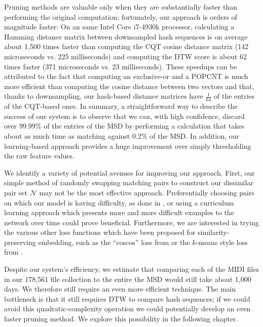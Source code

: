 Pruning methods are valuable only when they are substantially faster than performing the original computation; fortunately, our approach is orders of magnitude faster:
On an same Intel Core i7-4930k processor, calculating a Hamming distance matrix between downsampled hash sequences is on average about 1,500 times faster than computing the CQT cosine distance matrix (142 microseconds vs. 225 milliseconds) and computing the DTW score is about 62 times faster (371 microseconds vs. 23 milliseconds).
These speedups can be attributed to the fact that computing an exclusive-or and a POPCNT is much more efficient than computing the cosine distance between two vectors and that, thanks to downsampling, our hash-based distance matrices have $\frac{1}{64}$ of the entries of the CQT-based ones.
In summary, a straightforward way to describe the success of our system is to observe that we can, with high confidence, discard over 99.99\% of the entries of the MSD by performing a calculation that takes about as much time as matching against 0.2\% of the MSD.
In addition, our learning-based approach provides a huge improvement over simply thresholding the raw feature values.

We identify a variety of potential avenues for improving our approach.
First, our simple method of randomly swapping matching pairs to construct our dissimilar pair set $\mathcal{N}$ may not be the most effective approach.
Preferentially choosing pairs on which our model is having difficulty, as done in \cite{schroff2015facenet}, or using a curriculum learning approach which presents more and more difficult examples to the network over time \cite{bengio2009curriculum} could prove beneficial.
Furthermore, we are interested in trying the various other loss functions which have been proposed for similarity-preserving embedding, such as the ``coscos'' loss from \cite{kamper2016deep} or the $k$-means style loss from \cite{hershey2016deep}.

Despite our system's efficiency, we estimate that comparing each of the MIDI files in our 178,561 file collection to the entire the MSD would still take about 1,000 days.
We therefore still require an even more efficient technique.
The main bottleneck is that it still requires DTW to compare hash sequences; if we could avoid this quadratic-complexity operation we could potentially develop an even faster pruning method.
We explore this possibility in the following chapter.
